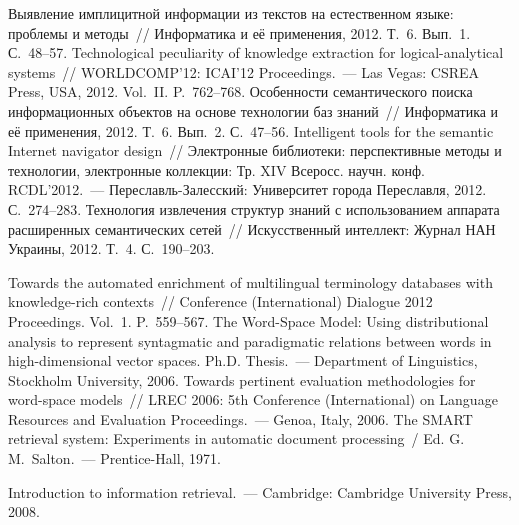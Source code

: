 \begin{multicols}{2}
{{\begin{thebibliography}{99}
 Выявление имплицитной информации из текстов на 
естественном языке: проб\-ле\-мы и методы~// Информатика и её применения, 2012. Т.~6. 
Вып.~1. С.~48--57.
Technological peculiarity of knowledge extraction for logical-analytical systems~// 
WORLDCOMP'12:  ICAI'12 Proceedings.~---  Las Vegas: CSREA Press, USA, 2012. Vol.~II. 
P.~762--768.
 Особенности семантического поиска 
информационных объектов на основе технологии баз знаний~// Информатика и её 
применения, 2012. Т.~6. Вып.~2. С.~47--56.
 Intelligent tools for the semantic Internet 
navigator design~// Электронные библиотеки: перспективные методы и технологии, 
электронные коллекции: Тр. XIV Всеросс. научн. конф. RCDL'2012.~--- 
Переславль-Залесский: Университет города Переславля, 2012. С.~274--283.
Технология извлечения структур знаний с использованием аппарата расширенных 
семантических сетей~// Искусственный интеллект: Журнал НАН Украины, 2012. Т.~4. 
С.~190--203.

 Towards the automated enrichment of multilingual terminology databases 
with knowledge-rich contexts~// Conference (International)  Dialogue 2012 Proceedings. Vol.~1. 
P.~559--567. 
 The Word-Space Model: Using distributional analysis to represent syntagmatic 
and paradigmatic relations between words in high-dimensional vector spaces. Ph.D. 
Thesis.~--- Department of Linguistics, Stockholm University, 2006.
 Towards pertinent evaluation methodologies for word-space models~// LREC 
2006:  5th Conference (International) on Language Resources and Evaluation Proceedings.~--- 
Genoa, Italy, 2006.
The SMART retrieval system: Experiments in automatic document processing~/ Ed.
 G.\,M.~Salton.~--- Prentice-Hall, 1971.
 
 \label{end\stat}
 
 Introduction to information retrieval.~--- Cambridge: Cambridge University Press, 2008.
\end{thebibliography}

}
}


\end{multicols}